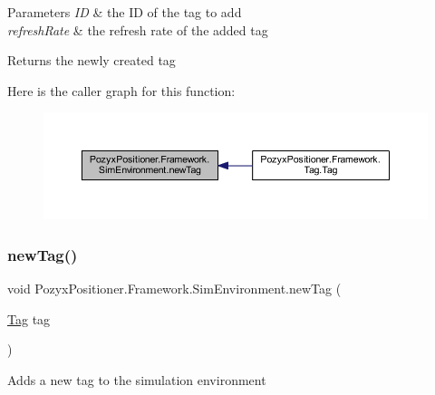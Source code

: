 \begin{DoxyParams}{Parameters}
{\em ID} & the ID of the tag to add\\
\hline
{\em refresh\+Rate} & the refresh rate of the added tag\\
\hline
\end{DoxyParams}
\begin{DoxyReturn}{Returns}
the newly created tag 
\end{DoxyReturn}
Here is the caller graph for this function\+:\nopagebreak
\begin{figure}[H]
\begin{center}
\leavevmode
\includegraphics[width=350pt]{class_pozyx_positioner_1_1_framework_1_1_sim_environment_ad523ae9a258ae7b68d7f966be92ff3bb_icgraph}
\end{center}
\end{figure}
\mbox{\label{class_pozyx_positioner_1_1_framework_1_1_sim_environment_ae804be21b53900cbac13c0cce385b170}} 
\subsubsection{\texorpdfstring{new\+Tag()}{newTag()}\hspace{0.1cm}{\footnotesize\ttfamily [2/2]}}
{\footnotesize\ttfamily void Pozyx\+Positioner.\+Framework.\+Sim\+Environment.\+new\+Tag (\begin{DoxyParamCaption}\item[{\hyperlink{class_pozyx_positioner_1_1_framework_1_1_tag}{Tag}}]{tag }\end{DoxyParamCaption})}



Adds a new tag to the simulation environment 


